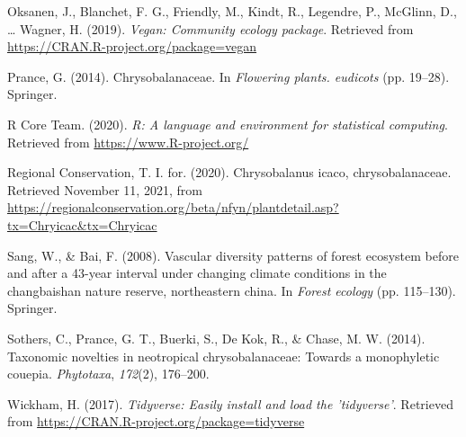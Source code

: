 \documentclass[11pt,]{article}
\begin{document}
\hypertarget{ref-veganR}{}
Oksanen, J., Blanchet, F. G., Friendly, M., Kindt, R., Legendre, P.,
McGlinn, D., \ldots{} Wagner, H. (2019). \emph{Vegan: Community ecology
package}. Retrieved from \url{https://CRAN.R-project.org/package=vegan}

\hypertarget{ref-prance2014chrysobalanaceae}{}
Prance, G. (2014). Chrysobalanaceae. In \emph{Flowering plants.
eudicots} (pp. 19--28). Springer.

\hypertarget{ref-RStudio}{}
R Core Team. (2020). \emph{R: A language and environment for statistical
computing}. Retrieved from \url{https://www.R-project.org/}

\hypertarget{ref-ircCicaco}{}
Regional Conservation, T. I. for. (2020). Chrysobalanus icaco,
chrysobalanaceae. Retrieved November 11, 2021, from
\url{https://regionalconservation.org/beta/nfyn/plantdetail.asp?tx=Chryicac\&tx=Chryicac}

\hypertarget{ref-sang2008vascular}{}
Sang, W., \& Bai, F. (2008). Vascular diversity patterns of forest
ecosystem before and after a 43-year interval under changing climate
conditions in the changbaishan nature reserve, northeastern china. In
\emph{Forest ecology} (pp. 115--130). Springer.

\hypertarget{ref-sothers2014taxonomic}{}
Sothers, C., Prance, G. T., Buerki, S., De Kok, R., \& Chase, M. W.
(2014). Taxonomic novelties in neotropical chrysobalanaceae: Towards a
monophyletic couepia. \emph{Phytotaxa}, \emph{172}(2), 176--200.

\hypertarget{ref-tidyverseR}{}
Wickham, H. (2017). \emph{Tidyverse: Easily install and load the
'tidyverse'}. Retrieved from
\url{https://CRAN.R-project.org/package=tidyverse}




\newpage
\singlespacing 
\end{document}
